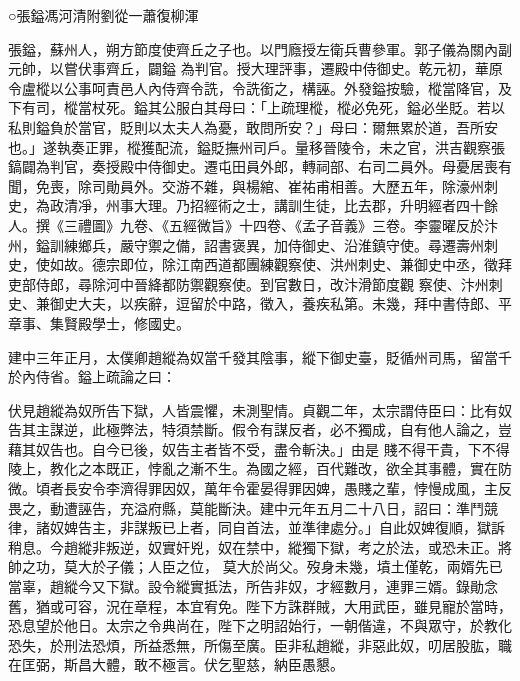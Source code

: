 
\begin{pinyinscope}

 ○張鎰馮河清附劉從一蕭復柳渾



 張鎰，蘇州人，朔方節度使齊丘之子也。以門廕授左衛兵曹參軍。郭子儀為關內副元帥，以嘗伏事齊丘，闢鎰
 為判官。授大理評事，遷殿中侍御史。乾元初，華原令盧樅以公事呵責邑人內侍齊令詵，令詵銜之，構誣。外發鎰按驗，樅當降官，及下有司，樅當杖死。鎰其公服白其母曰：「上疏理樅，樅必免死，鎰必坐貶。若以私則鎰負於當官，貶則以太夫人為憂，敢問所安？」母曰：爾無累於道，吾所安也。」遂執奏正罪，樅獲配流，鎰貶撫州司戶。量移晉陵令，未之官，洪吉觀察張鎬闢為判官，奏授殿中侍御史。遷屯田員外郎，轉祠部、右司二員外。母憂居喪有
 聞，免喪，除司勛員外。交游不雜，與楊綰、崔祐甫相善。大歷五年，除濠州刺史，為政清凈，州事大理。乃招經術之士，講訓生徒，比去郡，升明經者四十餘人。撰《三禮圖》九卷、《五經微旨》十四卷、《孟子音義》三卷。李靈曜反於汴州，鎰訓練鄉兵，嚴守禦之備，詔書褒異，加侍御史、沿淮鎮守使。尋遷壽州刺史，使如故。德宗即位，除江南西道都團練觀察使、洪州刺史、兼御史中丞，徵拜吏部侍郎，尋除河中晉絳都防禦觀察使。到官數日，改汴滑節度觀
 察使、汴州刺史、兼御史大夫，以疾辭，逗留於中路，徵入，養疾私第。未幾，拜中書侍郎、平章事、集賢殿學士，修國史。



 建中三年正月，太僕卿趙縱為奴當千發其陰事，縱下御史臺，貶循州司馬，留當千於內侍省。鎰上疏論之曰：



 伏見趙縱為奴所告下獄，人皆震懼，未測聖情。貞觀二年，太宗謂侍臣曰：比有奴告其主謀逆，此極弊法，特須禁斷。假令有謀反者，必不獨成，自有他人論之，豈藉其奴告也。自今已後，奴告主者皆不受，盡令斬決。」由是
 賤不得干貴，下不得陵上，教化之本既正，悖亂之漸不生。為國之經，百代難改，欲全其事體，實在防微。頃者長安令李濟得罪因奴，萬年令霍晏得罪因婢，愚賤之輩，悖慢成風，主反畏之，動遭誣告，充溢府縣，莫能斷決。建中元年五月二十八日，詔曰：準鬥競律，諸奴婢告主，非謀叛已上者，同自首法，並準律處分。」自此奴婢復順，獄訴稍息。今趙縱非叛逆，奴實奸兇，奴在禁中，縱獨下獄，考之於法，或恐未正。將帥之功，莫大於子儀；人臣之位，
 莫大於尚父。歿身未幾，墳土僅乾，兩婿先已當辜，趙縱今又下獄。設令縱實抵法，所告非奴，才經數月，連罪三婿。錄勛念舊，猶或可容，況在章程，本宜宥免。陛下方誅群賊，大用武臣，雖見寵於當時，恐息望於他日。太宗之令典尚在，陛下之明詔始行，一朝偕違，不與眾守，於教化恐失，於刑法恐煩，所益悉無，所傷至廣。臣非私趙縱，非惡此奴，叨居股肱，職在匡弼，斯昌大體，敢不極言。伏乞聖慈，納臣愚懇。




\end{pinyinscope}
